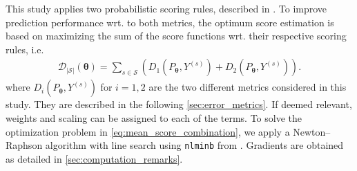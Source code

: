 This study applies two probabilistic scoring rules, described in . To improve prediction performance wrt. to both metrics, the optimum score estimation is based on maximizing the sum of the score functions wrt. their respective scoring rules, i.e.
\begin{align}
     \mathcal{D}_{{|\mathcal{S}|}}(\bm{\theta}) = \sum_{s \in \mathcal{S}} \left( D_1\left(P_{\bm{\theta}}, Y^{(s)}\right) + D_2\left(P_{\bm{\theta}}, Y^{(s)}\right) \right). \label{eq:mean_score_combination}
\end{align}
where $D_i(P_{\bm{\theta}}, Y^{(s)})$ for $i = 1,2$ are the two different metrics considered in this study. They are described in the following \cref{sec:error_metrics}. If deemed relevant, weights and scaling can be assigned to each of the terms. To solve the optimization problem in \cref{eq:mean_score_combination}, we apply a Newton–Raphson algorithm with line search using \texttt{nlminb} from \citet{R_stats}. Gradients are obtained as detailed in \cref{sec:computation_remarks}. 







